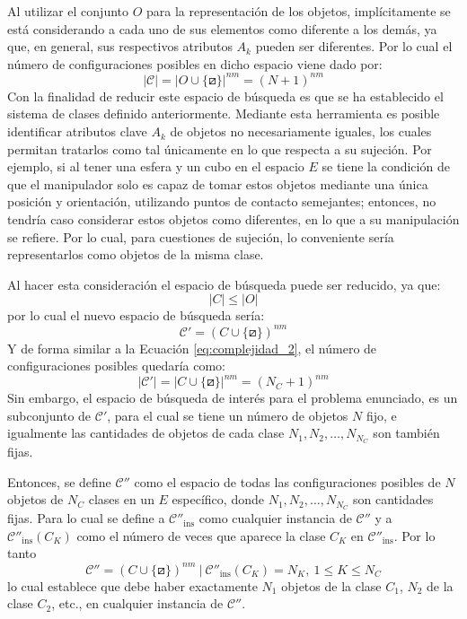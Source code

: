 Al utilizar el conjunto $O$ para la representación de los objetos, implícitamente se está considerando a cada uno de sus elementos como diferente a los demás, ya que, en general, sus respectivos atributos $A_k$ pueden ser diferentes.
Por lo cual el número de configuraciones posibles en dicho espacio viene dado por: 
%
\begin{equation}
	\label{eq:complejidad_2}
	|\mathcal{C}| = |O \cup \{ \boxslash \}|^{nm} = (N+1)^{nm}
\end{equation} 
%
Con la finalidad de reducir este espacio de búsqueda es que se ha establecido el sistema de clases definido anteriormente.
Mediante esta herramienta es posible identificar atributos clave $A_k$ de objetos no necesariamente iguales, los cuales permitan tratarlos como tal únicamente en lo que respecta a su sujeción.
Por ejemplo, si al tener una esfera y un cubo en el espacio $E$ se tiene la condición de que el manipulador solo es capaz de tomar estos objetos mediante una única posición y orientación, utilizando puntos de contacto semejantes; entonces, no tendría caso considerar estos objetos como diferentes, en lo que a su manipulación se refiere.
Por lo cual, para cuestiones de sujeción, lo conveniente sería representarlos como objetos de la misma clase.

Al hacer esta consideración el espacio de búsqueda puede ser reducido, ya que:
%
\begin{equation}
	\label{eq:complejidad_3}
	|C| \leq |O|
\end{equation}
%
por lo cual el nuevo espacio de búsqueda sería:
%
\begin{equation}
	\label{eq:complejidad_4}
	\mathcal{C}' = (C \cup \{ \boxslash \})^{nm}
\end{equation}
%
Y de forma similar a la Ecuación \ref{eq:complejidad_2}, el número de configuraciones posibles quedaría como:
%
\begin{equation}
	\label{eq:complejidad_5}
	|\mathcal{C}'| = |C \cup \{ \boxslash \}|^{nm} = (N_C+1)^{nm}
\end{equation}
%
Sin embargo, el espacio de búsqueda de interés para el problema enunciado, es un subconjunto de $\mathcal{C}'$, para el cual se tiene un número de objetos $N$ fijo, e igualmente las cantidades de objetos de cada clase $N_1, N_2, \ldots, N_{N_C}$ son también fijas.

Entonces, se define $\mathcal{C}''$ como el espacio de todas las configuraciones posibles de $N$ objetos de $N_C$ clases en un $E$ específico, donde $N_1, N_2, \ldots, N_{N_C}$ son cantidades fijas.
Para lo cual se define a $\mathcal{C}''_{\text{ins}}$ como cualquier instancia de $\mathcal{C}''$ y a $\mathcal{C}''_{\text{ins}}(C_K)$ como el número de veces que aparece la clase $C_K$ en $\mathcal{C}''_{\text{ins}}$.
Por lo tanto 
%
\begin{equation}
	\label{eq:complejidad_6}
	\mathcal{C}'' = (C \cup \{ \boxslash \})^{nm} \ | \ \mathcal{C}''_{\text{ins}}(C_K) = N_K,\ 1 \leq K \leq N_C
\end{equation}
%
lo cual establece que debe haber exactamente $N_1$ objetos de la clase $C_1$, $N_2$ de la clase $C_2$, etc., en cualquier instancia de $\mathcal{C}''$.

